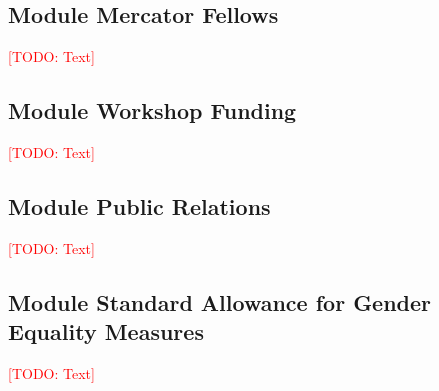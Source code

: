 \documentclass[american,firsttime]{dfgproposal}
\newcommand{\todo}[1]{\xspace{\textcolor{red}{[TODO: #1]}}\xspace}
\begin{document}
	\subsection{Module Mercator Fellows}
	\todo{Text}
	
	\subsection{Module Workshop Funding}
	\todo{Text}
	
	\subsection{Module Public Relations}
	\todo{Text}
	
	\subsection{Module Standard Allowance for Gender Equality Measures}
	\todo{Text}
\end{document}
